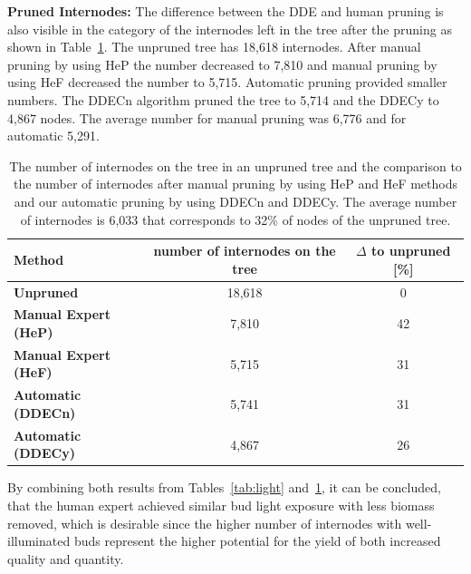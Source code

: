 \noindent\textbf{Pruned Internodes:} The difference between the DDE and human pruning is also visible in the category of the internodes left in the tree after the pruning as shown in Table~\ref{tab:inodes}. The unpruned tree has 18,618 internodes. After manual pruning by using HeP the number decreased to 7,810 and manual pruning by using HeF decreased the number to 5,715. Automatic pruning provided smaller numbers. The DDECn algorithm pruned the tree to 5,714 and the DDECy to 4,867 nodes. The average number for manual pruning was 6,776 and for automatic 5,291.
\begin{table}[hbt]
\caption{The number of internodes on the tree in an unpruned tree and the comparison to the number of internodes after manual pruning by using HeP and HeF methods and our automatic pruning by using DDECn and DDECy. The average number of internodes is 6,033 that corresponds to 32\% of nodes of the unpruned tree. }
\label{tab:inodes}
\begin{center}
\begin{tabular}{ |l|c|c| } 
 \hline
 \textbf{Method} & number of internodes on the tree  & $\Delta$ to unpruned [\%] \\ 
  \hline
 \textbf{Unpruned}            & 18,618 & 0 \\ 
 \hline
 \textbf{Manual Expert (HeP)} & 7,810 & 42 \\ 
 \textbf{Manual Expert (HeF)} & 5,715 & 31 \\ 
  \hline
 \textbf{Automatic (DDECn)} & 5,741 & 31 \\ 
 \textbf{Automatic (DDECy)} & 4,867 & 26 \\ 
 \hline
\end{tabular}
\end{center}
\end{table}

By combining both results from Tables~\ref{tab:light} and~\ref{tab:inodes}, 
it can be concluded, that the human expert
achieved similar bud light exposure with less biomass removed,
which is desirable since the higher number of internodes with
well-illuminated buds represent the higher potential for the yield of
both increased quality and quantity. 

